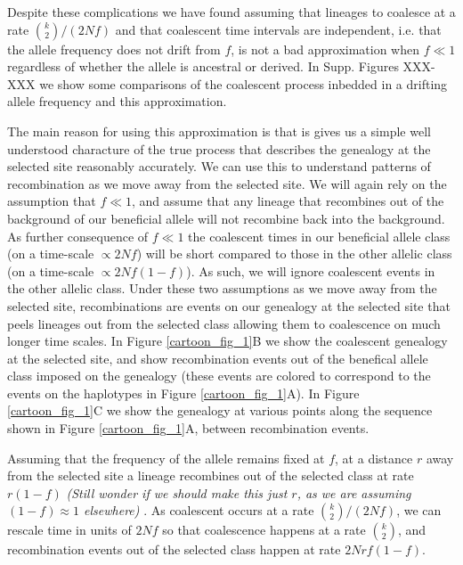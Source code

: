 \documentclass[a4paper,10pt]{article}
\newcommand{\gc}[1]{{\it \color{red} (#1)} }
\begin{document}
Despite these complications we have found assuming that lineages to coalesce at a rate $ {k \choose 2}/(2 N f)$ and that coalescent time intervals are independent, i.e. that the allele frequency does not drift from $f$, is not a bad approximation when $f \ll 1$ regardless of whether the allele is ancestral or derived. In Supp. Figures XXX-XXX we show some comparisons of the coalescent process inbedded in a drifting allele frequency and this approximation. 

The main reason for using this approximation is that is gives us a simple well understood characture of the true process that describes the genealogy at the selected site reasonably accurately. We can use this to understand patterns of recombination as we move away from the selected site. We will again rely on the assumption that $f \ll 1$, and assume that any lineage that recombines out of the background of our beneficial allele will not recombine back into the background. As further consequence of $f \ll 1$ the coalescent times in our beneficial allele class (on a time-scale $\propto 2Nf$) will be short compared to those in the other allelic class (on a time-scale $\propto 2Nf(1-f)$). As such, we will ignore coalescent events in the other allelic class. Under these two assumptions as we move away from the selected site, recombinations are events on our genealogy at the selected site that peels lineages out from the selected class allowing them to coalescence on much longer time scales. In Figure \ref{cartoon_fig_1}B we show the coalescent genealogy at the selected site, and show recombination events out of the benefical allele class imposed on the genealogy (these events are colored to correspond to the events on the haplotypes in Figure \ref{cartoon_fig_1}A). In 
Figure \ref{cartoon_fig_1}C we show the genealogy at various points along the sequence shown in Figure \ref{cartoon_fig_1}A, between recombination events. 

Assuming that the frequency of the allele remains fixed at $f$, at a distance $r$ away from the selected site a lineage recombines out of the selected class at rate $r(1-f)$ \gc{Still wonder if we should make this just $r$, as we are assuming $(1-f) \approx 1$ elsewhere}. As coalescent occurs at a rate ${k \choose 2}/(2Nf)$, we can rescale time in units of $2Nf$ so that coalescence happens at a rate ${k \choose 2}$, and recombination events out of the selected class happen at rate $2Nrf(1-f)$. 
\end{document}
